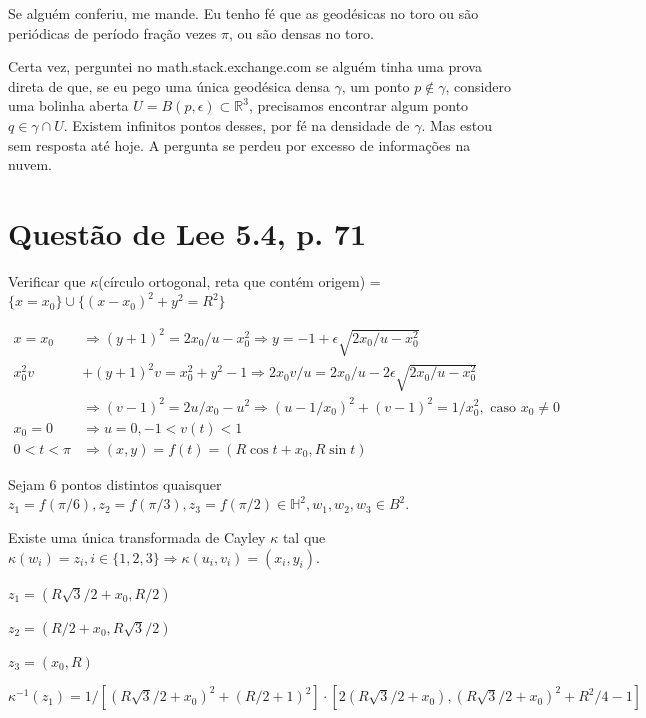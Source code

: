 \documentclass[10pt,a4paper]{article}
\begin{document}
		Se algu\'em conferiu, me mande. Eu tenho f\'e que as geod\'esicas no toro ou s\~ao peri\'odicas de per\'iodo fra\c{c}\~ao vezes $\pi$, ou s\~ao densas no toro.

		Certa vez, perguntei no math.stack.exchange.com se algu\'em tinha uma prova direta de que, se eu pego uma \'unica geod\'esica densa $\gamma$, um ponto $p \notin \gamma$, considero uma bolinha aberta $U = B(p, \epsilon) \subset \mathbb{R}^3$, precisamos encontrar algum ponto $q \in \gamma \cap U$. Existem infinitos pontos desses, por f\'e na densidade de $\gamma$. Mas estou sem resposta at\'e hoje. A pergunta se perdeu por excesso de informa\c{c}\~oes na nuvem.

	\section{Quest\~ao de Lee 5.4, p. 71}
		\begin{flushright}
		\end{flushright}

		Verificar que $\kappa$(c\'irculo ortogonal, reta que cont\'em origem) = $\{ x = x_0 \} \cup \{ (x - x_0)^2 + y^2 = R^2 \}$

		\begin{align*}
		x = x_0 &\Rightarrow (y + 1)^2 = 2x_0/u - x_0^2 \Rightarrow y = -1 + \epsilon \sqrt{2x_0/u - x_0^2} \\
		x_0^2 v &+ (y + 1)^2 v = x_0^2 + y^2 - 1 \Rightarrow 2x_0 v/u = 2x_0/u - 2\epsilon \sqrt{2x_0/u - x_0^2} \\
		&\Rightarrow (v - 1)^2 = 2u/x_0 - u^2 \Rightarrow (u - 1/x_0)^2 + (v - 1)^2 = 1/x_0^2, \text{ caso } x_0 \ne 0 \\
		x_0 = 0 &\Rightarrow u = 0, -1 < v(t) < 1\\
		0 < t < \pi &\Rightarrow (x, y) = f(t) = (R \cos t + x_0, R \sin t)
		\end{align*}

		Sejam 6 pontos distintos quaisquer $z_1 = f(\pi/6), z_2 = f(\pi/3), z_3 = f(\pi/2) \in \mathbb{H}^2, w_1, w_2, w_3 \in B^2$.

		Existe uma \'unica transformada de Cayley $\kappa$ tal que $\kappa(w_i) = z_i, i \in \{ 1, 2, 3 \} \Rightarrow \kappa(u_i, v_i) = (x_i, y_i)$.

		$z_1 = (R \sqrt{3}/2 + x_0, R/2)$

		$z_2 = (R/2 + x_0, R \sqrt{3}/2)$

		$z_3 = (x_0, R)$

		$\kappa^{-1}(z_1) = 1 / [(R\sqrt{3}/2 + x_0)^2 + (R/2 + 1)^2] \cdot [2(R\sqrt{3}/2 + x_0), (R\sqrt{3}/2 + x_0)^2 + R^2/4 - 1]$
\end{document}
